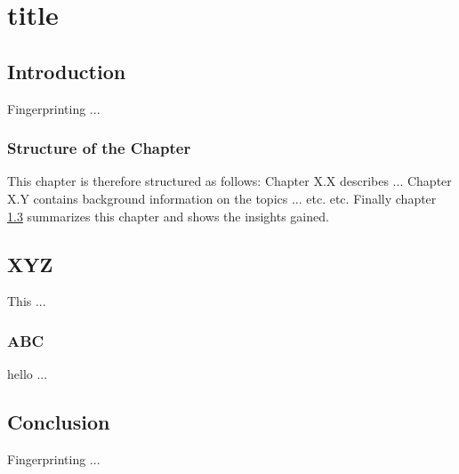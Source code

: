 \chapter{title}

\newcommand{\cmark}{\ding{51}}%
\newcommand{\xmark}{\ding{55}}%


\newpage

\minitoc %

\newpage




\newpage

\section{Introduction}
\label{intro}
Fingerprinting ...

\subsection{Structure of the Chapter} %
\label{structure}

This chapter is therefore structured as follows: Chapter X.X describes ... Chapter X.Y contains background information on the topics ... etc. etc. Finally chapter \ref{conclusion} summarizes this chapter and shows the insights gained.

\section{XYZ}
\label{xyz}
This ...

\subsection{ABC}
\label{abc}
hello ...


\section{Conclusion}
\label{conclusion}
Fingerprinting ...




